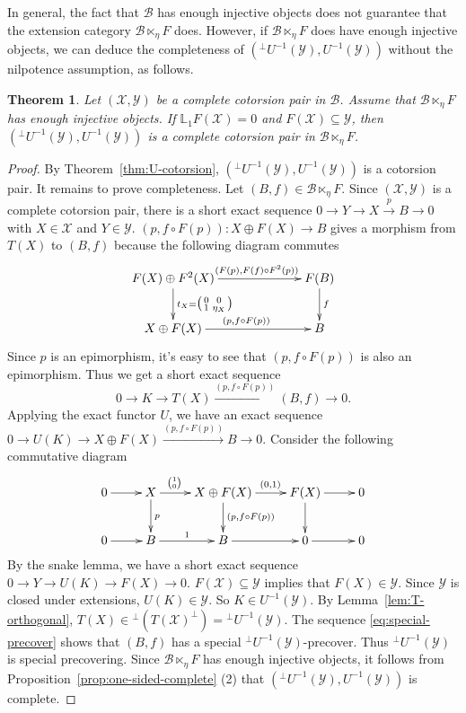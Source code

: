 \documentclass[11pt,reqno]{amsart}
\numberwithin{equation}{section}
\newtheorem{theorem}{Theorem}[section]
\newcommand{\cB}{\mathcal B}
\newcommand{\cX}{\mathcal X}
\newcommand{\cY}{\mathcal Y}
\begin{document}
In general, the fact that $\cB$ has enough injective objects does not guarantee that the extension category $\cB\ltimes_\eta F$ does. However, if $\cB\ltimes_\eta F$
does have enough injective objects, we can deduce the completeness of $({}^\perp U^{-1}(\cY), U^{-1}(\cY))$ without the nilpotence assumption, as follows.

\begin{theorem}\label{thm:U-completeness}
Let $(\cX,\cY)$ be a complete cotorsion pair in $\cB$. Assume that $\cB\ltimes_\eta F$ has enough injective objects. If $\mathbb{L}_1F(\cX)=0$ and $F(\cX)\subseteq \cY$, then $({}^\perp U^{-1}(\cY), U^{-1}(\cY))$ is
a complete cotorsion pair in $\cB\ltimes_\eta F$.
\end{theorem}
\begin{proof}
By Theorem~\ref{thm:U-cotorsion}, $({}^\perp U^{-1}(\cY), U^{-1}(\cY))$ is a cotorsion pair. It remains to prove completeness.
Let $(B,f)\in \cB\ltimes_\eta F$. Since $(\cX,\cY)$ is a complete cotorsion pair, there is a short exact sequence $0\to Y\to X\xrightarrow{p} B\to 0$ with $X\in \cX$ and $Y\in \cY$.
$(p, f\circ F(p))\colon X\oplus F(X)\to B$ gives a morphism from $T(X)$ to $(B,f)$ because the following diagram commutes
\[
\xymatrix@C=2.5pc{
F(X)\oplus F^2(X)\ar[rr]^{\ \ \ \ \ (F(p), F(f)\circ F^2(p))}\ar[d]^{t_X=\big(\begin{smallmatrix}0 & 0\\ 1 & \eta_X\end{smallmatrix}\big)} && F(B)\ar[d]^{f}\\
X\oplus F(X) \ar[rr]^{(p, f\circ F(p))} && B
}
\]
Since $p$ is an epimorphism, it's easy to see that $(p, f\circ F(p))$ is also an epimorphism. Thus we get a short exact sequence
\begin{equation}\label{eq:special-precover}
0\to K\to T(X)\xrightarrow{(p, f\circ F(p))}(B,f)\to 0.
\end{equation}
Applying the exact functor $U$, we have an exact sequence
$
0\to U(K)\to X\oplus F(X)\xrightarrow{(p, f\circ F(p))}B\to 0.
$
Consider the following commutative diagram
\[
\xymatrix{
0 \ar[r] & X \ar[r]^{\binom{1}{0}\ \ \ \ \ \ }\ar[d]^{p} & X\oplus F(X) \ar[r]^{\ \ \ (0,1)}\ar[d]^{(p, f\circ F(p))} & F(X) \ar[r]\ar[d] & 0\\
0 \ar[r] & B \ar[r]^{1} & B \ar[r] & 0 \ar[r] & 0
}
\]
By the snake lemma, we have a short exact sequence $0\to Y\to U(K)\to F(X)\to 0$. $F(\cX)\subseteq \cY$ implies that $F(X)\in \cY$. Since $\cY$ is closed under extensions,
$U(K)\in \cY$. So $K\in U^{-1}(\cY)$. By Lemma~\ref{lem:T-orthogonal}, $T(X)\in {}^\perp(T(\cX)^\perp)={}^\perp U^{-1}(\cY)$. The sequence \eqref{eq:special-precover}
shows that $(B,f)$ has a special ${}^\perp U^{-1}(\cY)$-precover. Thus ${}^\perp U^{-1}(\cY)$ is special precovering.
Since $\cB\ltimes_\eta F$ has enough injective objects, it follows from Proposition~\ref{prop:one-sided-complete} (2) that $({}^\perp U^{-1}(\cY), U^{-1}(\cY))$ is
complete.
\end{proof}
\end{document}
